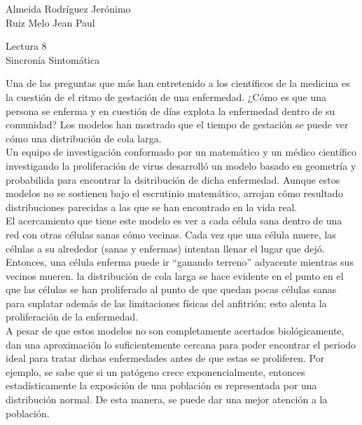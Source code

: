 \documentclass[a4paper, 12pt]{report}
\begin{document}
\begin{flushright}
    Almeida Rodríguez Jerónimo\\
    Ruiz Melo Jean Paul
\end{flushright}

\begin{center}
    {\LARGE Lectura 8}\\
    {\LARGE Sincronía Sintomática}
\end{center}

Una de las preguntas que más han entretenido a los científicos de la medicina es
la cuestión de el ritmo de gestación de una enfermedad. ¿Cómo es que una persona
se enferma y en cuestión de días explota la enfermedad dentro de su comunidad?
Los modelos han mostrado que el tiempo de gestación se puede ver cómo una
distribución de cola larga.\\

Un equipo de investigación conformado por un matemático y un médico científico
investigando la proliferación de virus desarrolló un modelo basado en geometría
y probabilida para encontrar la dsitribución de dicha enfermedad. Aunque estos
modelos no se sostienen bajo el escrutinio matemático, arrojan cómo resultado
distribuciones parecidas a las que se han encontrado en la vida real.\\

El acercamiento que tiene este modelo es ver a cada célula sana dentro de una
red con otras células sanas cómo vecinas. Cada vez que una célula muere, las
células a su alrededor (sanas y enfermas) intentan llenar el lugar que dejó.
Entonces, una célula enferma puede ir ``ganando terreno'' adyacente mientras sus
vecinos mueren. la distribución de cola larga se hace evidente en el punto en el
que las células se han proliferado al punto de que quedan pocas células sanas
para suplatar además de las limitaciones físicas del anfitrión; esto alenta la
proliferación de la enfermedad.\\

A pesar de que estos modelos no son completamente acertados biológicamente, dan
una aproximación lo suficientemente cercana para poder encontrar el periodo
ideal para tratar dichas enfermedades antes de que estas se proliferen. Por
ejemplo, se sabe que si un patógeno crece exponencialmente, entonces
estadísticamente la exposición de una población es representada por una
distribución normal. De esta manera, se puede dar una mejor atención a la
población.
\end{document}
